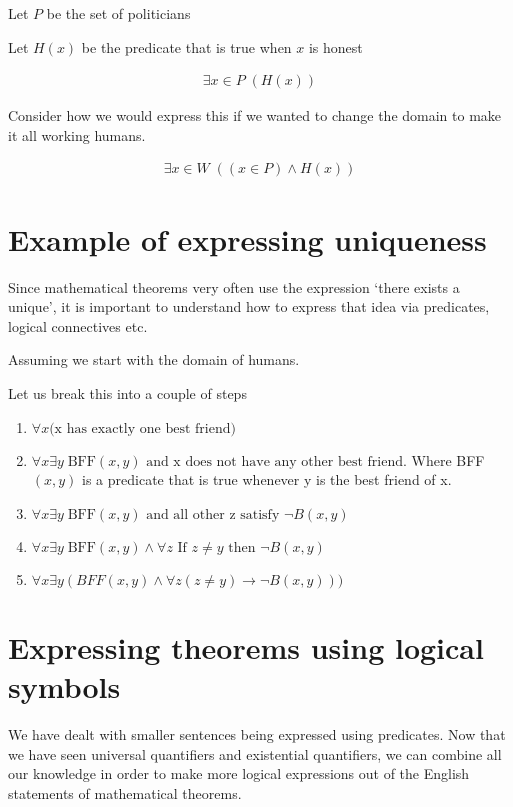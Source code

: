 \documentclass[12pt]{article}
\begin{document}
Let $P$ be the set of politicians

Let $H(x)$ be the predicate that is true when $x$ is honest

\begin{align*}
\exists x \in P \; (H(x))
\end{align*}

Consider how we would express this if we wanted to change the domain to make it all working humans. 

\begin{align*}
\exists x \in W \; ((x \in P) \wedge H(x))
\end{align*}

\section*{Example of expressing uniqueness}

Since mathematical theorems very often use the expression `there exists a unique', it is important to understand how to express that idea via predicates, logical connectives etc.

Assuming we start with the domain of humans. 


Let us break this into a couple of steps

\begin{enumerate}
\item $\forall x \text{(x has exactly one best friend)}$
\item $\forall x \exists y \; \text{BFF}(x,y) \text{ and x does not have any other best friend}$. Where BFF$(x,y)$ is a predicate that is true whenever y is the best friend of x. 
\item $\forall x \exists y \; \text{BFF} (x,y) \text{ and all other z satisfy } \neg B(x,y)$
\item $\forall x \exists y \; \text{BFF} (x,y) \wedge \forall z \text{ If } z \neq y \text{ then } \neg B(x,y)$
\item $\forall x \exists y (BFF (x,y) \wedge \forall z (z \neq y) \rightarrow \neg B(x,y)))$
\end{enumerate}


\section*{Expressing theorems using logical symbols}

We have dealt with smaller sentences being expressed using predicates. Now that we have seen universal quantifiers and existential quantifiers, we can combine all our knowledge in order to make more logical expressions out of the English statements of mathematical theorems. 
\end{document}
